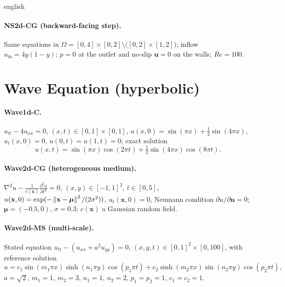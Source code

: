 \begin{hyphenrules}{english}
\paragraph{NS2d-CG (backward-facing step).} Same equations in
$\Omega=[0,4]\times[0,2]\setminus\big([0,2]\times[1,2]\big)$; inflow $u_{\mathrm{in}}=4y(1-y)$; $p=0$ at the
outlet and no-slip $\mathbf{u}=0$ on the walls; $Re=100$.

\section{Wave Equation (hyperbolic)}
\paragraph{Wave1d-C.} $u_{tt}-4u_{xx}=0$, $(x,t)\in[0,1]\times[0,1]$,
$u(x,0)=\sin(\pi x)+\frac12\sin(4\pi x)$, $u_t(x,0)=0$, $u(0,t)=u(1,t)=0$; exact solution
\[
  u(x,t)=\sin(\pi x)\cos(2\pi t)+\tfrac12\sin(4\pi x)\cos(8\pi t).
\]

\paragraph{Wave2d-CG (heterogeneous medium).} $\nabla^2u-\frac{1}{c(\mathbf{x})}\frac{\partial^2u}{\partial t^2}=0$,
$(x,y)\in[-1,1]^2$, $t\in[0,5]$, $u(\mathbf{x},0)=\exp(-\left\lVert \mathbf{x}-\bm\mu \right\rVert^2/(2\sigma^2))$, $u_t(\mathbf{x},0)=0$, Neumann
condition $\partial u/\partial\mathbf{n}=0$; $\bm\mu=(-0.5,0)$, $\sigma=0.3$; $c(\mathbf{x})$ a Gaussian random field.

\paragraph{Wave2d-MS (multi-scale).} Stated equation $u_{tt}-(u_{xx}+a^2u_{yy})=0$,
$(x,y,t)\in[0,1]^2\times[0,100]$, with reference solution
\[
  u=c_1\sin(m_1\pi x)\sinh(n_1\pi y)\cos(p_1\pi t)+c_2\sinh(m_2\pi x)\sin(n_2\pi y)\cos(p_2\pi t),
\]
$a=\sqrt2$, $m_1=1$, $m_2=3$, $n_1=1$, $n_2=2$, $p_1=p_2=1$, $c_1=c_2=1$.


\end{hyphenrules}
